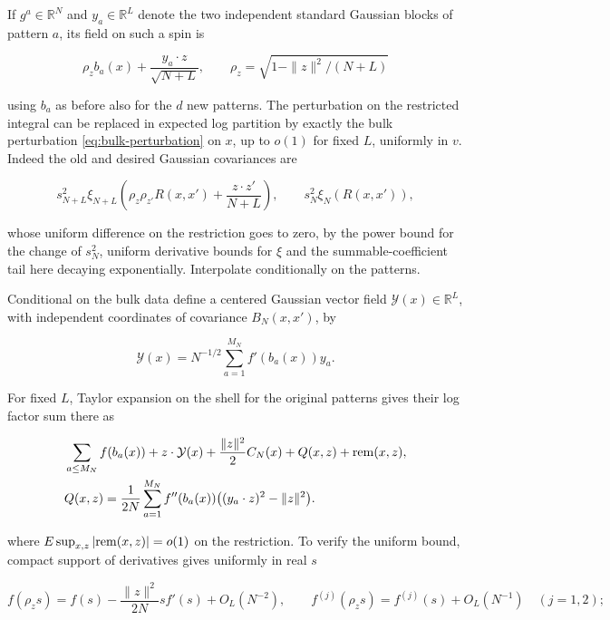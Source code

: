 \documentclass[11pt]{article}
\begin{document}
If $g^a\in\mathbb R^N$ and $y_a\in\mathbb R^L$ denote the two independent standard Gaussian blocks of pattern $a$, its field on such a spin is

\begin{equation*}
\rho_z b_a(x)+\frac{y_a\cdot z}{\sqrt{N+L}},\qquad
 \rho_z=\sqrt{1-\|z\|^2/(N+L)}
\end{equation*}

using $b_a$ as before also for the $d$ new patterns. The perturbation on the restricted integral can be replaced in expected log partition by exactly the bulk perturbation \eqref{eq:bulk-perturbation} on $x$, up to $o(1)$ for fixed $L$, uniformly in $v$. Indeed the old and desired Gaussian covariances are

\begin{equation*}
s_{N+L}^2 \xi_{N+L}\left(\rho_z\rho_{z'} R(x,x')+\frac{z\cdot z'}{N+L}\right),
 \qquad s_N^2\xi_N(R(x,x')) ,
\end{equation*}

whose uniform difference on the restriction goes to zero, by the power bound for the change of $s_N^2$, uniform derivative bounds for $\xi$ and the summable-coefficient tail here decaying exponentially. Interpolate conditionally on the patterns.

Conditional on the bulk data define a centered Gaussian vector field $\mathcal Y(x)\in\mathbb R^L$, with independent coordinates of covariance $B_N(x,x')$, by

\begin{equation*}
\mathcal Y(x)=N^{-1/2}\sum_{a=1}^{M_N} f'(b_a(x)) y_a .
\end{equation*}

For fixed $L$, Taylor expansion on the shell for the original patterns gives their log factor sum there as

\begin{equation}\label{eq:cavity-expansion}
\begin{aligned}
 &\sum_{a\le M_N} f(b_a(x))+
 z\cdot\mathcal Y(x)+\frac{\|z\|^2}{2} C_N(x)+Q(x,z)+{\rm rem}(x,z),\\
 &Q(x,z)=\frac1{2N}\sum_{a=1}^{M_N} f''(b_a(x))
                  \big((y_a\cdot z)^2-\|z\|^2\big).
\end{aligned}
\end{equation}

where $E\sup_{x,z}|{\rm rem}(x,z)|=o(1)$ on the restriction. To verify the uniform bound, compact support of derivatives gives uniformly in real $s$

\begin{equation*}
f(\rho_z s)=f(s)-\frac{\|z\|^2}{2N}s f'(s)+O_L(N^{-2}),
 \qquad f^{(j)}(\rho_z s)=f^{(j)}(s)+O_L(N^{-1})\quad(j=1,2);
\end{equation*}
\end{document}
